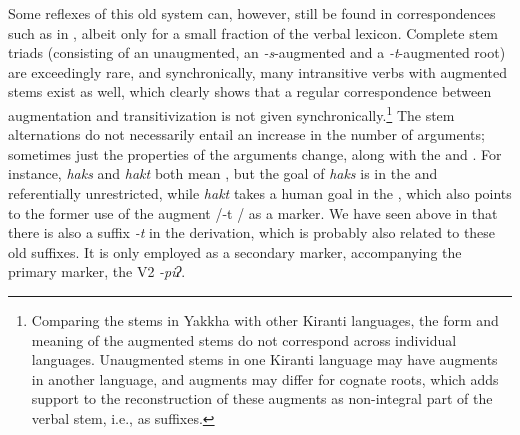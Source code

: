 Some reflexes of this old system can, however, still be found in correspondences such as in , albeit only for a small fraction of the verbal lexicon. Complete stem triads (consisting of an unaugmented, an \emph{-s}-augmented and a \emph{-t}-augmented root) are exceedingly rare, and synchronically, many intransitive verbs with augmented stems exist as well, which clearly shows that a regular correspondence between augmentation and transitivization is not given synchronically.\footnote{Comparing the stems in Yakkha with other Kiranti languages, the form and meaning of the augmented stems do not correspond across individual languages. Unaugmented stems in one Kiranti language may have augments in another language, and augments may differ for cognate roots, which adds support to the reconstruction of these augments as non-integral part of the verbal stem, i.e., as suffixes.} The stem alternations do not necessarily entail an increase in the number of arguments; sometimes just the properties of the arguments change, along with the  and . For instance, \emph{haks} and \emph{hakt} both mean , but the goal of \emph{haks} is in the   and referentially unrestricted, while \emph{hakt} takes a human goal in the , which also points to the former use of the augment /-t / as a  marker. We have seen above in  that there is also a suffix \emph{-t}  in the  derivation, which is probably also related to these old suffixes. It is only employed as a secondary marker, accompanying the primary  marker, the V2 \emph{-piʔ}. 



